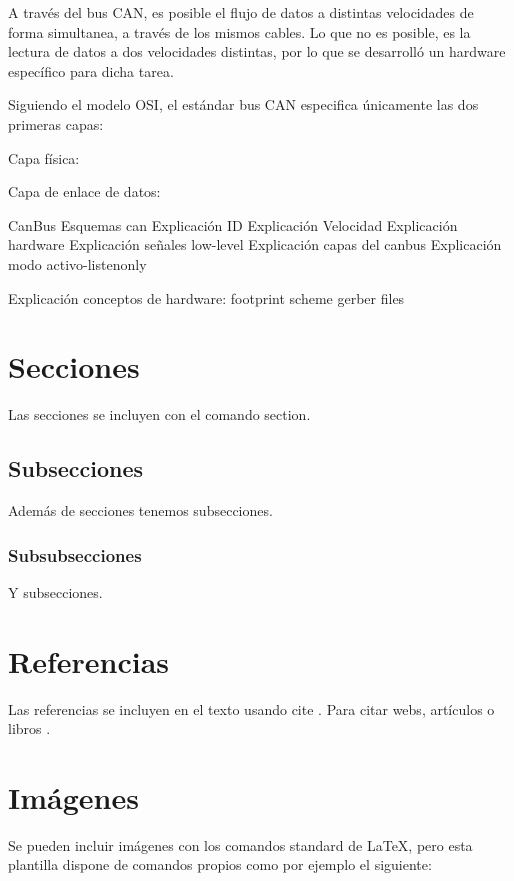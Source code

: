 A través del bus CAN, es posible el flujo de datos a distintas velocidades de forma simultanea, a través de los mismos cables. Lo que no es posible, es la lectura de datos a dos velocidades distintas, por lo que se desarrolló un hardware específico para dicha tarea.



Siguiendo el modelo OSI, el estándar bus CAN especifica únicamente las dos primeras capas:

Capa física:

Capa de enlace de datos:


CanBus
Esquemas can
Explicación ID
Explicación Velocidad
Explicación hardware
Explicación señales low-level
Explicación capas del canbus
Explicación modo activo-listenonly

Explicación conceptos de hardware:
footprint
scheme
gerber files


\section{Secciones}

Las secciones se incluyen con el comando section.

\subsection{Subsecciones}

Además de secciones tenemos subsecciones.

\subsubsection{Subsubsecciones}

Y subsecciones. 


\section{Referencias}

Las referencias se incluyen en el texto usando cite \cite{wiki:latex}. Para citar webs, artículos o libros \cite{koza92}.


\section{Imágenes}

Se pueden incluir imágenes con los comandos standard de \LaTeX, pero esta plantilla dispone de comandos propios como por ejemplo el siguiente:

